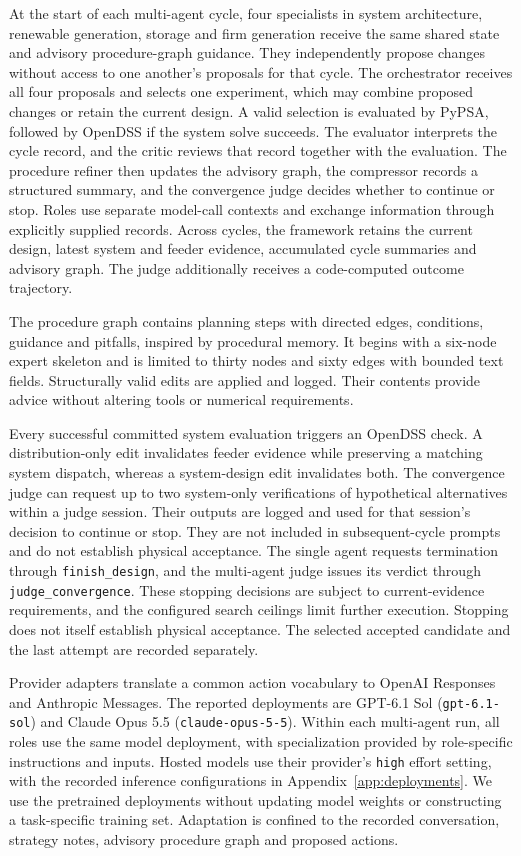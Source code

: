 \documentclass[pdflatex,sn-nature]{sn-jnl}
\begin{document}
At the start of each multi-agent cycle, four specialists in system architecture, renewable generation, storage and firm generation receive the same shared state and advisory procedure-graph guidance. They independently propose changes without access to one another's proposals for that cycle. The orchestrator receives all four proposals and selects one experiment, which may combine proposed changes or retain the current design. A valid selection is evaluated by PyPSA, followed by OpenDSS if the system solve succeeds. The evaluator interprets the cycle record, and the critic reviews that record together with the evaluation. The procedure refiner then updates the advisory graph, the compressor records a structured summary, and the convergence judge decides whether to continue or stop. Roles use separate model-call contexts and exchange information through explicitly supplied records. Across cycles, the framework retains the current design, latest system and feeder evidence, accumulated cycle summaries and advisory graph. The judge additionally receives a code-computed outcome trajectory.

The procedure graph contains planning steps with directed edges, conditions, guidance and pitfalls, inspired by procedural memory\cite{lu2026procedural}. It begins with a six-node expert skeleton and is limited to thirty nodes and sixty edges with bounded text fields. Structurally valid edits are applied and logged. Their contents provide advice without altering tools or numerical requirements.

Every successful committed system evaluation triggers an OpenDSS check. A distribution-only edit invalidates feeder evidence while preserving a matching system dispatch, whereas a system-design edit invalidates both. The convergence judge can request up to two system-only verifications of hypothetical alternatives within a judge session. Their outputs are logged and used for that session's decision to continue or stop. They are not included in subsequent-cycle prompts and do not establish physical acceptance. The single agent requests termination through \texttt{finish\_design}, and the multi-agent judge issues its verdict through \texttt{judge\_convergence}. These stopping decisions are subject to current-evidence requirements, and the configured search ceilings limit further execution. Stopping does not itself establish physical acceptance. The selected accepted candidate and the last attempt are recorded separately.

Provider adapters translate a common action vocabulary to OpenAI Responses and Anthropic Messages. The reported deployments are GPT-6.1 Sol (\texttt{gpt-6.1-sol}) and Claude Opus 5.5 (\texttt{claude-opus-5-5})\cite{anthropic2026opus55}. Within each multi-agent run, all roles use the same model deployment, with specialization provided by role-specific instructions and inputs. Hosted models use their provider's \texttt{high} effort setting, with the recorded inference configurations in Appendix~\ref{app:deployments}. We use the pretrained deployments without updating model weights or constructing a task-specific training set. Adaptation is confined to the recorded conversation, strategy notes, advisory procedure graph and proposed actions.
\end{document}
